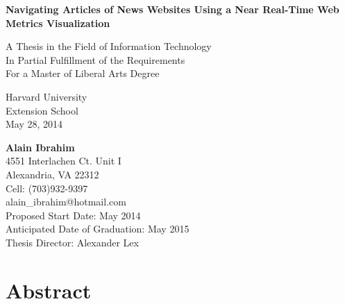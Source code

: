 \documentclass[12pt]{article}
\begin{document}

\begin{titlepage}
    \begin{center}
        \vspace*{0.5cm}
        
        \begin{doublespace}        
        \textbf{\Large Navigating Articles of News Websites Using a Near Real-Time Web Metrics Visualization}
        \vfill


        A Thesis in the Field of Information Technology \\
        In Partial Fulfillment of the Requirements \\
        For a Master of Liberal Arts Degree
        
        \vspace{0.8cm}
        
        Harvard University \\
        Extension School \\
        May 28, 2014        
        
        \vspace{1.5cm}
        
        \textbf{Alain Ibrahim} \\
        4551 Interlachen Ct. Unit I \\
        Alexandria, VA 22312 \\
        Cell: (703)932-9397 \\
		alain\_ibrahim@hotmail.com \\   
        Proposed Start Date: May 2014 \\
        Anticipated Date of Graduation: May 2015 \\
        Thesis Director: Alexander Lex \\
		\end{doublespace}        
        
        \vfill
         
    \end{center}
\end{titlepage}

\tableofcontents

\vfill


\section{Abstract}
\end{document}
